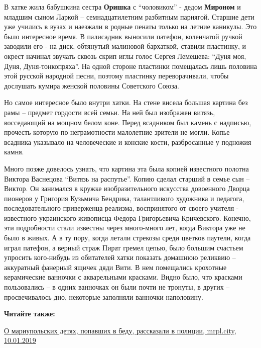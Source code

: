 В хатке жила бабушкина сестра \textbf{Оришка} с \enquote{чоловиком} - дедом \textbf{Мироном} и
младшим сыном Ларкой – семнадцатилетним разбитным парнягой. Старшие дети уже
учились в вузах и наезжали в родные пенаты только на летние каникулы. Это было
интересное время. В палисадник выносили патефон, коленчатой ручкой заводили его
- на диск, обтянутый малиновой бархаткой, ставили пластинку, и окрест начинал
звучать сквозь скрип иглы голос Сергея Лемешева: \enquote{Дуня моя, Дуня,
Дуня-тонкопряха}. На одной стороне пластинки помещалась лишь половина этой
русской народной песни, поэтому пластинку переворачивали, чтобы дослушать
кумира женской половины Советского Союза.

Но самое интересное было внутри хатки. На стене висела большая картина без рамы
– предмет гордости всей семьи. На ней был изображен витязь, восседающий на
мощном белом коне. Перед всадником был камень с надписью, прочесть которую по
неграмотности малолетние зрители не могли. Копье всадника указывало на
человеческие и конские кости, разбросанные у подножия камня.

Много позже довелось узнать, что картина эта была копией известного полотна
Виктора Васнецова \enquote{Витязь на распутье}. Копию сделал старший в семье сын –
Виктор. Он занимался в кружке изобразительного искусства довоенного Дворца
пионеров у Григория Кузьмича Бендрика, талантливого художника и педагога,
последовательного приверженца реализма, воспринятого от своего учителя -
известного украинского живописца Федора Григорьевича Кричевского. Конечно, эти
подробности стали известны через много-много лет, когда Виктора уже не было в
живых. А в ту пору, когда летали стрекозы среди цветков паутели, когда играл
патефон, а верный страж Пират гремел цепью, было большим счастьем упросить
кого-нибудь из обитателей хатки показать домашнюю реликвию – аккуратный
фанерный ящичек дяди Вити. В нем помещались крохотные керамические ванночки с
акварельными красками. Видно было, что красками пользовались – в одних
ванночках он были почти не тронуты, в других – просвечивалось дно, некоторые
заполняли ванночки наполовину.

\vspace{0.5cm}
\begin{minipage}{0.9\textwidth}
\textbf{Читайте также:}

\href{https://mrpl.city/news/view/o-mariupolskih-detyah-popavshih-v-bedu-rasskazali-v-politsii-foto-plusvideo}{%
О мариупольских детях, попавших в беду, рассказали в полиции, mrpl.city, 10.01.2019}
\end{minipage}
\vspace{0.5cm}

